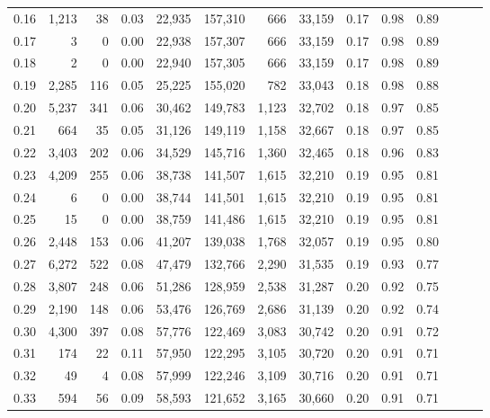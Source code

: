 \begin{tabular}{rrrrrrrrrrrrrr}
0.16 &   1,213 &     38 &  0.03 &   22,935 &  157,310 &     666 &  33,159 &  0.17 &  0.98 &      0.89 \\
0.17 &       3 &      0 &  0.00 &   22,938 &  157,307 &     666 &  33,159 &  0.17 &  0.98 &      0.89 \\
0.18 &       2 &      0 &  0.00 &   22,940 &  157,305 &     666 &  33,159 &  0.17 &  0.98 &      0.89 \\
0.19 &   2,285 &    116 &  0.05 &   25,225 &  155,020 &     782 &  33,043 &  0.18 &  0.98 &      0.88 \\
0.20 &   5,237 &    341 &  0.06 &   30,462 &  149,783 &   1,123 &  32,702 &  0.18 &  0.97 &      0.85 \\
0.21 &     664 &     35 &  0.05 &   31,126 &  149,119 &   1,158 &  32,667 &  0.18 &  0.97 &      0.85 \\
0.22 &   3,403 &    202 &  0.06 &   34,529 &  145,716 &   1,360 &  32,465 &  0.18 &  0.96 &      0.83 \\
0.23 &   4,209 &    255 &  0.06 &   38,738 &  141,507 &   1,615 &  32,210 &  0.19 &  0.95 &      0.81 \\
0.24 &       6 &      0 &  0.00 &   38,744 &  141,501 &   1,615 &  32,210 &  0.19 &  0.95 &      0.81 \\
0.25 &      15 &      0 &  0.00 &   38,759 &  141,486 &   1,615 &  32,210 &  0.19 &  0.95 &      0.81 \\
0.26 &   2,448 &    153 &  0.06 &   41,207 &  139,038 &   1,768 &  32,057 &  0.19 &  0.95 &      0.80 \\
0.27 &   6,272 &    522 &  0.08 &   47,479 &  132,766 &   2,290 &  31,535 &  0.19 &  0.93 &      0.77 \\
0.28 &   3,807 &    248 &  0.06 &   51,286 &  128,959 &   2,538 &  31,287 &  0.20 &  0.92 &      0.75 \\
0.29 &   2,190 &    148 &  0.06 &   53,476 &  126,769 &   2,686 &  31,139 &  0.20 &  0.92 &      0.74 \\
0.30 &   4,300 &    397 &  0.08 &   57,776 &  122,469 &   3,083 &  30,742 &  0.20 &  0.91 &      0.72 \\
0.31 &     174 &     22 &  0.11 &   57,950 &  122,295 &   3,105 &  30,720 &  0.20 &  0.91 &      0.71 \\
0.32 &      49 &      4 &  0.08 &   57,999 &  122,246 &   3,109 &  30,716 &  0.20 &  0.91 &      0.71 \\
0.33 &     594 &     56 &  0.09 &   58,593 &  121,652 &   3,165 &  30,660 &  0.20 &  0.91 &      0.71 \\

\end{tabular}
